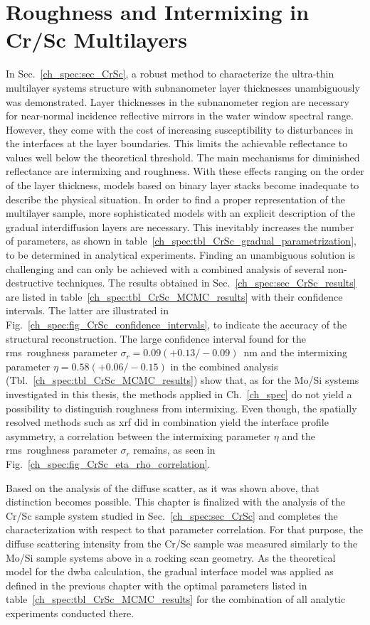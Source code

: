 \section{Roughness and Intermixing in Cr/Sc Multilayers} \label{ch_diff:sec_CrSc}
In Sec.~\ref{ch_spec:sec_CrSc}, a robust method to characterize the ultra-thin multilayer systems structure with subnanometer layer thicknesses unambiguously was demonstrated. Layer thicknesses in the subnanometer region are necessary for near-normal incidence 
reflective mirrors in the water window spectral range. However, they come with 
the cost of increasing susceptibility to disturbances in the interfaces at the 
layer boundaries. This limits the achievable reflectance to values well below 
the theoretical threshold. The main mechanisms for diminished reflectance are 
intermixing and roughness. With these effects ranging on the order of the 
layer thickness, models based on binary layer stacks become inadequate to 
describe the physical situation. In order to find a proper representation of 
the multilayer sample, more sophisticated models with an explicit description 
of the gradual interdiffusion layers are necessary. This inevitably 
increases the number of parameters, as shown in table~\ref{ch_spec:tbl_CrSc_gradual_parametrization}, to be determined in analytical experiments. 
Finding an unambiguous solution is challenging and can only be achieved with a 
combined analysis of several non-destructive techniques. The results obtained in Sec.~\ref{ch_spec:sec_CrSc_results} are listed in table~\ref{ch_spec:tbl_CrSc_MCMC_results} with their confidence intervals. The latter are illustrated in Fig.~\ref{ch_spec:fig_CrSc_confidence_intervals}, to indicate the accuracy of the structural reconstruction. The large confidence interval found for the \gls{rms}~roughness parameter $\sigma_r = 0.09(+0.13/-0.09)$~nm and the intermixing parameter $\eta = 0.58(+0.06/-0.15)$ in the combined analysis (Tbl.~\ref{ch_spec:tbl_CrSc_MCMC_results}) show that, as for the Mo/Si systems investigated in this thesis, the methods applied in Ch.~\ref{ch_spec} do not yield a possibility to distinguish roughness from intermixing. Even though, the spatially resolved methods such as \gls{xrf} did in combination yield the interface profile asymmetry, a correlation between the intermixing parameter $\eta$ and the \gls{rms}~roughness parameter $\sigma_r$ remains, as seen in Fig.~\ref{ch_spec:fig_CrSc_eta_rho_correlation}.

Based on the analysis of the diffuse scatter, as it was shown above, that distinction becomes possible. This chapter is finalized with the analysis of the Cr/Sc sample system studied in Sec.~\ref{ch_spec:sec_CrSc} and completes the characterization with respect to that parameter correlation. For that purpose, the diffuse scattering intensity from the Cr/Sc sample was measured similarly to the Mo/Si sample systems above in a rocking scan geometry. As the theoretical model for the \gls{dwba} calculation, the gradual interface model was applied as defined in the previous chapter with the optimal parameters listed in table~\ref{ch_spec:tbl_CrSc_MCMC_results} for the combination of all analytic experiments conducted there.

